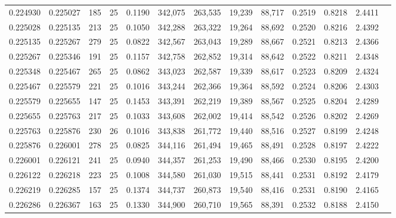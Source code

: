 \begin{tabular}{rrrrrrrrrrrrr}
0.224930 & 0.225027 &   185 &  25 &                                     0.1190 & 342,075 & 263,535 &  19,239 &  88,717 & 0.2519 & 0.8218 & 2.4411 \\
0.225028 & 0.225135 &   213 &  25 &                                     0.1050 & 342,288 & 263,322 &  19,264 &  88,692 & 0.2520 & 0.8216 & 2.4392 \\
0.225135 & 0.225267 &   279 &  25 &                                     0.0822 & 342,567 & 263,043 &  19,289 &  88,667 & 0.2521 & 0.8213 & 2.4366 \\
0.225267 & 0.225346 &   191 &  25 &                                     0.1157 & 342,758 & 262,852 &  19,314 &  88,642 & 0.2522 & 0.8211 & 2.4348 \\
0.225348 & 0.225467 &   265 &  25 &                                     0.0862 & 343,023 & 262,587 &  19,339 &  88,617 & 0.2523 & 0.8209 & 2.4324 \\
0.225467 & 0.225579 &   221 &  25 &                                     0.1016 & 343,244 & 262,366 &  19,364 &  88,592 & 0.2524 & 0.8206 & 2.4303 \\
0.225579 & 0.225655 &   147 &  25 &                                     0.1453 & 343,391 & 262,219 &  19,389 &  88,567 & 0.2525 & 0.8204 & 2.4289 \\
0.225655 & 0.225763 &   217 &  25 &                                     0.1033 & 343,608 & 262,002 &  19,414 &  88,542 & 0.2526 & 0.8202 & 2.4269 \\
0.225763 & 0.225876 &   230 &  26 &                                     0.1016 & 343,838 & 261,772 &  19,440 &  88,516 & 0.2527 & 0.8199 & 2.4248 \\
0.225876 & 0.226001 &   278 &  25 &                                     0.0825 & 344,116 & 261,494 &  19,465 &  88,491 & 0.2528 & 0.8197 & 2.4222 \\
0.226001 & 0.226121 &   241 &  25 &                                     0.0940 & 344,357 & 261,253 &  19,490 &  88,466 & 0.2530 & 0.8195 & 2.4200 \\
0.226122 & 0.226218 &   223 &  25 &                                     0.1008 & 344,580 & 261,030 &  19,515 &  88,441 & 0.2531 & 0.8192 & 2.4179 \\
0.226219 & 0.226285 &   157 &  25 &                                     0.1374 & 344,737 & 260,873 &  19,540 &  88,416 & 0.2531 & 0.8190 & 2.4165 \\
0.226286 & 0.226367 &   163 &  25 &                                     0.1330 & 344,900 & 260,710 &  19,565 &  88,391 & 0.2532 & 0.8188 & 2.4150 \\

\end{tabular}
